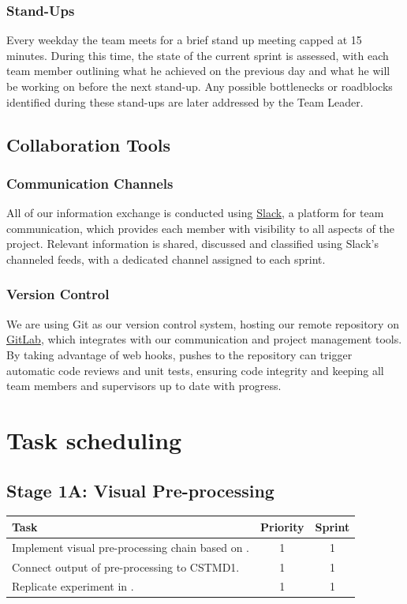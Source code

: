\documentclass[a4paper,11pt]{article}
\begin{document}
\subsubsection{Stand-Ups}
Every weekday the team meets for a brief stand up meeting capped at 15 minutes. During this time, the state of the current sprint is assessed, with each team member outlining what he achieved on the previous day and what he will be working on before the next stand-up. Any possible bottlenecks or roadblocks identified during these stand-ups are later addressed by the Team Leader.

\subsection{Collaboration Tools}

\subsubsection{Communication Channels}
All of our information exchange is conducted using \href{http://slack.com}{Slack}, a platform for team communication, which provides each member with visibility to all aspects of the project. Relevant information is shared, discussed and classified using Slack's channeled feeds, with a dedicated channel assigned to each sprint.

\subsubsection{Version Control}
We are using Git as our version control system, hosting our remote repository on \href{http://gitlab.com}{GitLab}, which integrates with our communication and project management tools. By taking advantage of web hooks, pushes to the repository can trigger automatic code reviews and unit tests, ensuring code integrity and keeping all team members and supervisors up to date with progress.

\section{Task scheduling}
\subsection{Stage 1A: Visual Pre-processing}
\begin{center}
    \begin{tabular}{p{12cm} c c}
    \textbf{Task} & \textbf{Priority} & \textbf{Sprint} \\ \hline
	Implement visual pre-processing chain based on \cite{hal11}. & 1 & 1 \\
	Connect output of pre-processing to CSTMD1. & 1 & 1\\
	Replicate experiment in \cite{w13}. & 1 & 1 \\
    \end{tabular}
\end{center}
\end{document}
